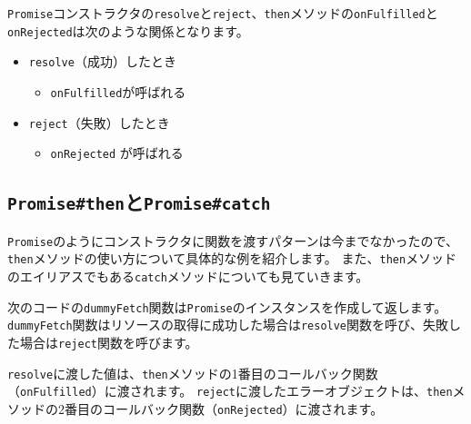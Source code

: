 \texttt{Promise}コンストラクタの\texttt{resolve}と\texttt{reject}、\texttt{then}メソッドの\texttt{onFulfilled}と\texttt{onRejected}は次のような関係となります。

\begin{itemize}
\item
  \texttt{resolve}（成功）したとき

  \begin{itemize}
  \item
    \texttt{onFulfilled}が呼ばれる
  \end{itemize}
\item
  \texttt{reject}（失敗）したとき

  \begin{itemize}
  \item
    \texttt{onRejected} が呼ばれる
  \end{itemize}
\end{itemize}

\hypertarget{promise-then-and-catch}{%
\subsection{\texorpdfstring{\texttt{Promise\#then}と\texttt{Promise\#catch}}{Promise\#thenとPromise\#catch}}\label{promise-then-and-catch}}

\texttt{Promise}のようにコンストラクタに関数を渡すパターンは今までなかったので、\texttt{then}メソッドの使い方について具体的な例を紹介します。
また、\texttt{then}メソッドのエイリアスでもある\texttt{catch}メソッドについても見ていきます。

次のコードの\texttt{dummyFetch}関数は\texttt{Promise}のインスタンスを作成して返します。
\texttt{dummyFetch}関数はリソースの取得に成功した場合は\texttt{resolve}関数を呼び、失敗した場合は\texttt{reject}関数を呼びます。

\texttt{resolve}に渡した値は、\texttt{then}メソッドの1番目のコールバック関数（\texttt{onFulfilled}）に渡されます。
\texttt{reject}に渡したエラーオブジェクトは、\texttt{then}メソッドの2番目のコールバック関数（\texttt{onRejected}）に渡されます。\enlargethispage{\baselineskip}

